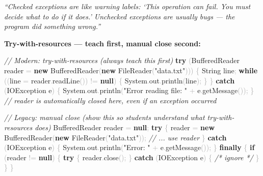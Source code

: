 \documentclass[
  justified,
  openright,
]{tufte-book}
\newcommand{\KeywordTok}[1]{\textcolor{CodeKeyword}{\textbf{#1}}}  %
\newcommand{\StringTok}[1]{\textcolor{CodeString}{#1}}              %
\newcommand{\CommentTok}[1]{\textcolor{CodeComment}{\textit{#1}}}  %
\newcommand{\CodeFuncTok}[1]{\textcolor{CodeKeyword}{#1}}           %
\newcommand{\OperatorTok}[1]{\textcolor{DarkGray}{#1}}              %
\newenvironment{Shaded}{%
  \begin{mdframed}[style=TufteCode]%
}{%
  \end{mdframed}%
}
\begin{document}
\emph{``Checked exceptions are like warning labels: `This operation can
fail. You must decide what to do if it does.' Unchecked exceptions are
usually bugs --- the program did something wrong.''}

\textbf{Try-with-resources --- teach first, manual close second:}

\begin{Shaded}
\begin{Highlighting}[]
\CommentTok{// Modern: try{-}with{-}resources (always teach this first)}
\KeywordTok{try} \OperatorTok{(}BufferedReader reader \OperatorTok{=} \KeywordTok{new} BufferedReader\OperatorTok{(}\KeywordTok{new} FileReader\OperatorTok{(}\StringTok{"data.txt"}\OperatorTok{)))} \OperatorTok{\{}
    String line\OperatorTok{;}
    \KeywordTok{while} \OperatorTok{((}line \OperatorTok{=} reader\OperatorTok{.}\CodeFuncTok{readLine}\OperatorTok{())} \OperatorTok{!=} \KeywordTok{null}\OperatorTok{)} \OperatorTok{\{}
        System\OperatorTok{.}\CodeFuncTok{out}\OperatorTok{.}\CodeFuncTok{println}\OperatorTok{(}line\OperatorTok{);}
    \OperatorTok{\}}
\OperatorTok{\}} \KeywordTok{catch} \OperatorTok{(}IOException e\OperatorTok{)} \OperatorTok{\{}
    System\OperatorTok{.}\CodeFuncTok{out}\OperatorTok{.}\CodeFuncTok{println}\OperatorTok{(}\StringTok{"Error reading file: "} \OperatorTok{+} e\OperatorTok{.}\CodeFuncTok{getMessage}\OperatorTok{());}
\OperatorTok{\}}
\CommentTok{// reader is automatically closed here, even if an exception occurred}
 
\CommentTok{// Legacy: manual close (show this so students understand what try{-}with{-}resources does)}
BufferedReader reader \OperatorTok{=} \KeywordTok{null}\OperatorTok{;}
\KeywordTok{try} \OperatorTok{\{}
    reader \OperatorTok{=} \KeywordTok{new} BufferedReader\OperatorTok{(}\KeywordTok{new} FileReader\OperatorTok{(}\StringTok{"data.txt"}\OperatorTok{));}
    \CommentTok{// ... use reader}
\OperatorTok{\}} \KeywordTok{catch} \OperatorTok{(}IOException e\OperatorTok{)} \OperatorTok{\{}
    System\OperatorTok{.}\CodeFuncTok{out}\OperatorTok{.}\CodeFuncTok{println}\OperatorTok{(}\StringTok{"Error: "} \OperatorTok{+} e\OperatorTok{.}\CodeFuncTok{getMessage}\OperatorTok{());}
\OperatorTok{\}} \KeywordTok{finally} \OperatorTok{\{}
    \KeywordTok{if} \OperatorTok{(}reader \OperatorTok{!=} \KeywordTok{null}\OperatorTok{)} \OperatorTok{\{}
        \KeywordTok{try} \OperatorTok{\{} reader\OperatorTok{.}\CodeFuncTok{close}\OperatorTok{();} \OperatorTok{\}} \KeywordTok{catch} \OperatorTok{(}IOException e\OperatorTok{)} \OperatorTok{\{} \CommentTok{/* ignore */} \OperatorTok{\}}
    \OperatorTok{\}}
\OperatorTok{\}}
\end{Highlighting}
\end{Shaded}
\end{document}
